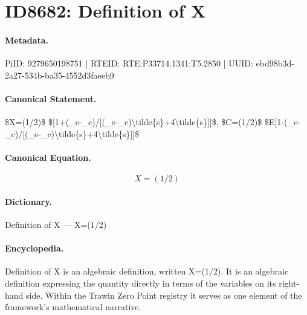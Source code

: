 \section*{ID8682: Definition of X}
\paragraph{Metadata.}
PiID: 9279650198751 | RTEID: RTE:P33714.1341:T5.2850 | UUID: ebd98b3d-2a27-534b-ba35-4552d3faeeb9

\paragraph{Canonical Statement.}
\$X=(1/2)\$ \$[1+(\_e-\_c)/[(\_e-\_c)\textbackslash{}tilde\{s\}+4\textbackslash{}tilde\{s\}]]\$, \$C=(1/2)\$ \$E[1-(\_e-\_c)/[(\_e-\_c)\textbackslash{}tilde\{s\}+4\textbackslash{}tilde\{s\}]]\$

\paragraph{Canonical Equation.}
\[
X=(1/2)
\]

\paragraph{Dictionary.}
Definition of X — X=(1/2)

\paragraph{Encyclopedia.}
Definition of X is an algebraic definition, written X=(1/2). It is an algebraic definition expressing the quantity directly in terms of the variables on its right-hand side. Within the Trawin Zero Point registry it serves as one element of the framework's mathematical narrative.
